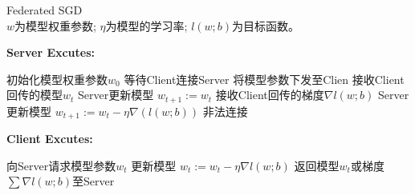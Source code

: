 \begin{algorithm}
\caption{Federated SGD
\\$w$为模型权重参数; $\eta$为模型的学习率; $l(w;b)$为目标函数。}
\label{FedSGDServer}
{\bfseries Server Excutes:}
\begin{algorithmic}
\STATE 初始化模型权重参数$w_0$
\REPEAT
\STATE 等待Client连接Server
\STATE 将模型参数下发至Clien
\STATE 接收Client回传的模型$w_t$
\STATE Server更新模型 $w_{t+1} := w_{t}$
\STATE 接收Client回传的梯度$\nabla{l(w;b)}$
\STATE Server更新模型 $w_{t+1} := w_t - \eta\nabla(l(w;b))$
\ELSE
\STATE 非法连接
\ENDIF
{}
\end{algorithmic}
{\bfseries Client Excutes:}
\begin{algorithmic}
\STATE 向Server请求模型参数$w_t$
\STATE 更新模型 $w_t := w_t-\eta\nabla{l(w;b)}$
\ENDFOR
\STATE 返回模型$w_t$或梯度$\sum{\nabla{l(w;b)}}$至Server 
\end{algorithmic}
\end{algorithm}